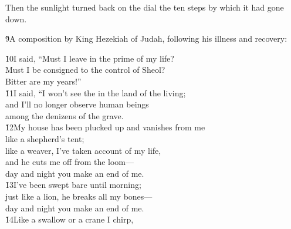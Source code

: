 Then the sunlight turned back on the dial the ten steps by which it had gone down.

\v{9}A composition by King Hezekiah of Judah, following his illness and recovery:

\begin{poetry}
\poeml \v{10}I said, ``Must I leave in the prime of my life? \\
\poemll    Must I be consigned to the control of Sheol? \\
\poemlll       Bitter are my years!'' \\
\poeml \v{11}I said, ``I won't see the  in the land of the living; \\
\poemll    and I'll no longer observe human beings \\
\poemlll       among the denizens of the grave. \\
\poeml \v{12}My house has been plucked up and vanishes from me \\
\poemll    like a shepherd's tent; \\
\poeml like a weaver, I've taken account of my life, \\
\poemll    and he cuts me off from the loom--- \\
\poemlll       day and night you make an end of me. \\
\poeml \v{13}I've been swept bare until morning; \\
\poemll    just like a lion, he breaks all my bones--- \\
\poemlll       day and night you make an end of me. \\
\poeml \v{14}Like a swallow or a crane I chirp, \\

\end{poetry}

